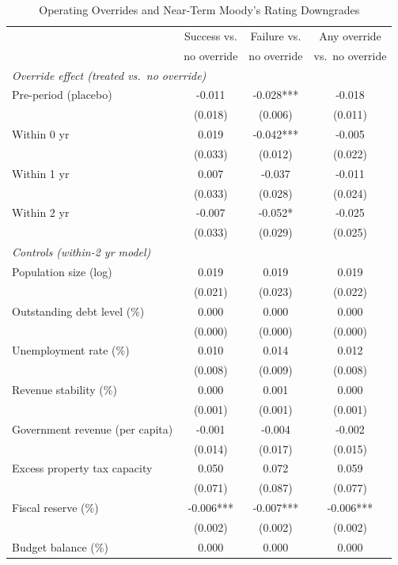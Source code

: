 \begin{table}[!htbp]
\centering
\caption{Operating Overrides and Near-Term Moody's Rating Downgrades}
\label{tab:post_northeast_did_downgrade}
\small
\begin{tabular}{lccc}
\toprule
 & Success vs. & Failure vs. & Any override \\
 & no override & no override & vs.\ no override \\
\midrule
\multicolumn{4}{l}{\textit{Override effect (treated vs.\ no override)}} \\
\quad Pre-period (placebo) & -0.011 & -0.028*** & -0.018 \\
 & (0.018) & (0.006) & (0.011) \\
\quad Within 0 yr & 0.019 & -0.042*** & -0.005 \\
 & (0.033) & (0.012) & (0.022) \\
\quad Within 1 yr & 0.007 & -0.037 & -0.011 \\
 & (0.033) & (0.028) & (0.024) \\
\quad Within 2 yr & -0.007 & -0.052* & -0.025 \\
 & (0.033) & (0.029) & (0.025) \\
\midrule
\multicolumn{4}{l}{\textit{Controls (within-2 yr model)}} \\
\quad Population size (log) & 0.019 & 0.019 & 0.019 \\
 & (0.021) & (0.023) & (0.022) \\
\quad Outstanding debt level (\%) & 0.000 & 0.000 & 0.000 \\
 & (0.000) & (0.000) & (0.000) \\
\quad Unemployment rate (\%) & 0.010 & 0.014 & 0.012 \\
 & (0.008) & (0.009) & (0.008) \\
\quad Revenue stability (\%) & 0.000 & 0.001 & 0.000 \\
 & (0.001) & (0.001) & (0.001) \\
\quad Government revenue (per capita) & -0.001 & -0.004 & -0.002 \\
 & (0.014) & (0.017) & (0.015) \\
\quad Excess property tax capacity & 0.050 & 0.072 & 0.059 \\
 & (0.071) & (0.087) & (0.077) \\
\quad Fiscal reserve (\%) & -0.006*** & -0.007*** & -0.006*** \\
 & (0.002) & (0.002) & (0.002) \\
\quad Budget balance (\%) & 0.000 & 0.000 & 0.000 \\

\end{tabular}
\end{table}
